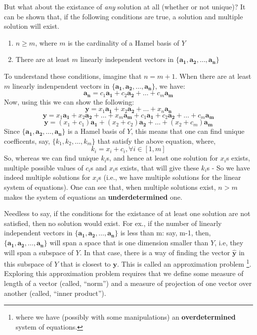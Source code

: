 But what about the existance of \emph{any} solution at all (whether or not unique)? It can be shown that, if the following conditions are true, a solution and multiple solution will exist.
	\begin{enumerate}
	\item \(n \geq m\), where \(m\) is the cardinality of a Hamel basis of \(Y\)
	\item There are at least \(m\) linearly independent vectors in  \( \{ \mathbf{a_1}, \mathbf{a_2}, \ldots, \mathbf{a_n}\} \)
	\end{enumerate}
To understand these conditions, imagine that \(n = m+1\). When there are at least \(m\) linearly indenpendent vectors in  \( \{ \mathbf{a_1}, \mathbf{a_2}, \ldots, \mathbf{a_n}\} \), we have:
	\[ \mathbf{a_n} = c_1\mathbf{a_1} + c_2\mathbf{a_2} + \ldots + c_m\mathbf{a_m} \]
Now, using this we can show the following:
	\[ \mathbf{y} = x_1\mathbf{a_1} + x_2\mathbf{a_2} + \ldots + x_n\mathbf{a_n} \]
	\[ \mathbf{y} = x_1\mathbf{a_1} + x_2\mathbf{a_2} + \ldots + x_m\mathbf{a_m} + c_1\mathbf{a_1} + c_2\mathbf{a_2} + \ldots + c_m\mathbf{a_m} \]
	\[ \mathbf{y} = (x_1 + c_1)\mathbf{a_1} + (x_2 + c_2)\mathbf{a_2} + \ldots + (x_2 + c_m)\mathbf{a_m} \]
Since \( \{ \mathbf{a_1}, \mathbf{a_2}, \ldots, \mathbf{a_n}\} \) is a Hamel basis of \(Y\), this means that one can find unique coefficents, say, \( \{k_1, k_2, \ldots, k_m \} \) that satisfy the above equation, where, 
	\[ k_i = x_i + c_i, \forall i \in [1,m] \]
So, whereas we can find unique \(k_i\)s, and hence at least one solution for \(x_i\)s  exists, multiple possible values of \(c_i\)s and \(x_i\)s exists, that will give these \(k_i\)s - So we have indeed multiple solutions for \(x_i\)s (i.e., we have multiple solutions for the linear system of equations). One can see that, when multiple solutions exist, \(n > m\) makes the system of equations an \textbf{underdetermined} one.

Needless to say, if the conditions for the existance of at least one solution are not satisfied, then no solution would exist. For ex., if the number of linearly independent vectors in \( \{ \mathbf{a_1}, \mathbf{a_2}, \ldots, \mathbf{a_n}\} \) is less than m: say, m-1, then, \( \{ \mathbf{a_1}, \mathbf{a_2}, \ldots, \mathbf{a_n}\} \) will span a space that is one dimension smaller than \(Y\), i.e, they will span a subspace of \(Y\). In that case, there is a way of finding the vector \( \hat{\mathbf{y}} \) in this subspace of \(Y\) that is closest to \(\mathbf{y}\). This is called an approximation problem \footnote{where we have (possibly with some manipulations) an \textbf{overdetermined} system of equations. }. Exploring this approximation problem requires that we define some measure of length of a vector (called, ``norm'') and a measure of projection of one vector over another (called, ``inner product''). 

